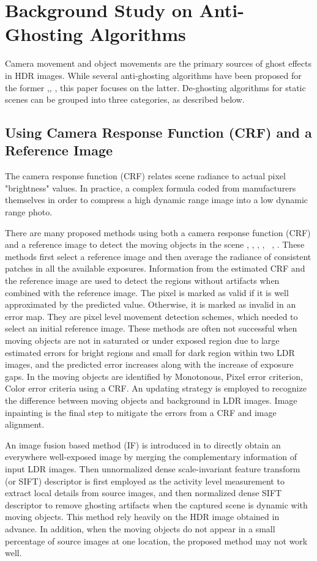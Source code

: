 \documentclass[preprint,12pt,3p]{elsarticle}
\begin{document}
\section{Background Study on Anti-Ghosting Algorithms}
\label{sec2}

Camera movement and object movements are the primary sources of ghost effects in HDR images. While several anti-ghosting algorithms have been proposed for the former \cite{5},\cite{10}, \cite{11}, this paper focuses on the latter.  De-ghosting algorithms for static scenes can be grouped into three categories, as described below.

\subsection{Using Camera Response Function (CRF) and a Reference Image}
\label{subsub1}

 The camera response function (CRF) relates scene radiance to actual pixel "brightness" values. In practice, a complex formula coded from manufacturers themselves in order to compress a high dynamic range image into a low dynamic range photo.
 
 There are many proposed methods using both a camera response function (CRF) and a reference image to detect the moving objects in the scene  \cite{9}, \cite{2},  \cite{20}, \cite{21}, \cite{23}\, \cite{24}, \cite{25}.  These methods first select a reference image and then average the radiance of consistent patches in all the available exposures. Information from the estimated CRF and the reference image are used to detect the regions without artifacts when combined with the reference image. The pixel is marked as valid if it is well approximated by the predicted value.  Otherwise, it is marked as invalid in an error map.  They are pixel level movement detection schemes, which needed to select an initial reference image. These methods are often not successful when moving objects are not in saturated or under exposed region due to large estimated errors for bright regions and small for dark region within two LDR images, and the predicted error increases along with the increase of exposure gaps.
 In \cite{1} the moving objects are identified by Monotonous, Pixel error criterion, Color error criteria using a CRF.  An updating strategy is employed to recognize the difference between moving objects and background in LDR images. Image inpainting is the final step to mitigate the errors from a CRF and image alignment.
   
 An image fusion based method (IF) is introduced in \cite{liu2015dense} to directly obtain an everywhere well-exposed image by merging the complementary information of input LDR images. Then unnormalized dense scale-invariant feature transform (or SIFT) descriptor is first employed as the activity level measurement to extract local details from source images, and then normalized dense SIFT descriptor to remove ghosting artifacts when the captured scene is dynamic with moving objects. This method rely heavily on the HDR image obtained in advance. In addition, when the moving objects do not appear in a small percentage of source images at one location, the proposed method may not work well.
 
\end{document}
